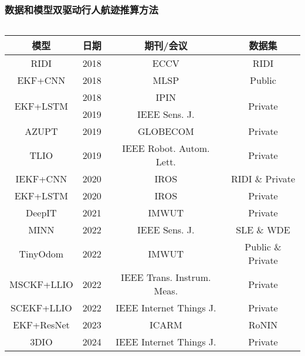 \begin{frame}
	\frametitle{数据和模型双驱动行人航迹推算方法}
	\begin{columns}[t]
		\begin{column}{0.5\textwidth}
		{
		    \tiny
		    \setlength{\tabcolsep}{2pt}
			\begin{tabular*}{\linewidth}{@{\extracolsep{\fill}}cccc}
				\toprule
				\multicolumn{1}{c}{模型} & 日期 & 期刊/会议 & 数据集 \\
				\midrule
				    \rowcolor{gray!50} RIDI & 2018 & ECCV                            & RIDI                     \\
				                    EKF+CNN & 2018 & MLSP                            & Public                   \\
				  \multirow{2}{*}{EKF+LSTM} & 2018 & IPIN                            & \multirow{2}{*}{Private} \\
				                            & 2019 & IEEE Sens. J.                   &                          \\
				                      AZUPT & 2019 & GLOBECOM                        & Private                  \\	
				    \rowcolor{gray!50} TLIO & 2019 & IEEE Robot. Autom. Lett.        & Private                  \\
				\rowcolor{gray!50} IEKF+CNN & 2020 & IROS                            & RIDI \& Private          \\
				                   EKF+LSTM & 2020 & IROS                            & Private                  \\
				                     DeepIT & 2021 & IMWUT                           & Private                  \\
				                       MINN & 2022 & IEEE Sens. J.                   & SLE \& WDE               \\
				                   TinyOdom & 2022 & IMWUT                           & Public \& Private        \\
				                 MSCKF+LLIO & 2022 & IEEE Trans. Instrum. Meas.      & Private                  \\
				                 SCEKF+LLIO & 2022 & IEEE Internet Things J.         & Private                  \\
				                 EKF+ResNet & 2023 & ICARM                           & RoNIN                    \\
				    \rowcolor{gray!50} 3DIO & 2024 & IEEE Internet Things J.         & Private                  \\

\end{tabular*}}
\end{column}
\end{columns}
\end{frame}

